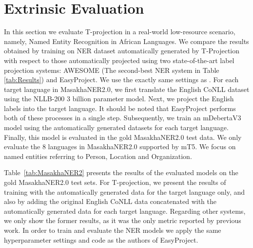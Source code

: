 \documentclass[11pt]{article}
\begin{document}
\section{Extrinsic Evaluation}\label{sec:ExtrinsicEval}

In this section we evaluate T-projection in a real-world low-resource scenario, namely, Named Entity Recognition in African Languages. We compare the results obtained by training on NER dataset automatically generated by T-Projection with respect to those automatically projected using two state-of-the-art label projection systems: AWESOME (The second-best NER system in Table \ref{tab:Results}) and EasyProject. 
We use the exactly same settings as \citet{DBLP:journals/corr/abs-2211-15613}. For each target language in MasakhaNER2.0, we first translate the English CoNLL dataset using the NLLB-200 3 billion parameter model. Next, we project the English labels into the target language. It should be noted that EasyProject performs both of these processes in a single step. Subsequently, we train an mDebertaV3 \cite{DBLP:conf/iclr/HeLGC21} model using the automatically generated datasets for each target language. Finally, this model is evaluated in the gold MasakhaNER2.0 test data. We only evaluate the 8 languages in MasakhaNER2.0 supported by mT5. We focus on named entities referring to Person, Location and Organization. 


Table~\ref{tab:MasakhaNER2} presents the results of the evaluated models on the gold MasakhaNER2.0 test sets. For T-projection, we present the results of training with the automatically generated data for the target language only, and also by adding the original English CoNLL data concatenated with the automatically generated data for each target language. Regarding other systems, we only show the former results, as it was the only metric reported by previous work. In order to train and evaluate the NER models we apply the same hyperparameter settings and code as the authors of EasyProject.
\end{document}
